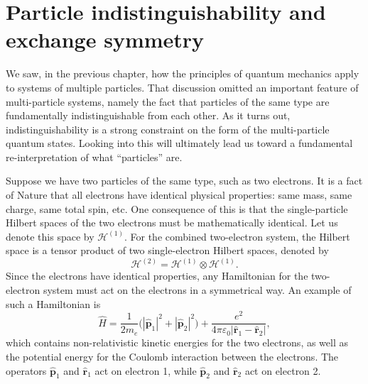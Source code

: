 \documentclass[pra,12pt]{revtex4}
\begin{document}
\section{Particle indistinguishability and exchange symmetry}

We saw, in the previous chapter, how the principles of quantum
mechanics apply to systems of multiple particles.  That discussion
omitted an important feature of multi-particle systems, namely the
fact that particles of the same type are fundamentally
indistinguishable from each other.  As it turns out,
indistinguishability is a strong constraint on the form of the
multi-particle quantum states.  Looking into this will ultimately lead
us toward a fundamental re-interpretation of what ``particles'' are.

Suppose we have two particles of the same type, such as two electrons.
It is a fact of Nature that all electrons have identical physical
properties: same mass, same charge, same total spin, etc.  One
consequence of this is that the single-particle Hilbert spaces of the
two electrons must be mathematically identical.  Let us denote this
space by $\mathscr{H}^{(1)}$.  For the combined two-electron system,
the Hilbert space is a tensor product of two single-electron Hilbert
spaces, denoted by
$$\mathscr{H}^{(2)} = \mathscr{H}^{(1)} \otimes \mathscr{H}^{(1)}.$$
Since the electrons have identical properties, any Hamiltonian for the
two-electron system must act on the electrons in a symmetrical way.
An example of such a Hamiltonian is
$$\hat{H} = \frac{1}{2m_e} \Big(|\hat{\mathbf{p}}_1|^2 + |\hat{\mathbf{p}}_2|^2\Big) + \frac{e^2}{4\pi\varepsilon_0|\hat{\mathbf{r}}_1 - \hat{\mathbf{r}}_2|},$$
which contains non-relativistic kinetic energies for the two
electrons, as well as the potential energy for the Coulomb interaction
between the electrons.  The operators $\hat{\mathbf{p}}_1$ and
$\hat{\mathbf{r}}_1$ act on electron 1, while $\hat{\mathbf{p}}_2$ and
$\hat{\mathbf{r}}_2$ act on electron 2.
\end{document}
